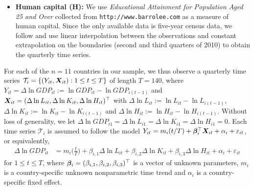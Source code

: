 \documentclass[a4paper,12pt]{article}
\makeatletter
\renewcommand{\eqref}[1]{\tagform@{\ref{#1}}}
\makeatother
\begin{document}
\begin{itemize}[leftmargin=0.5cm]
\item \textbf{Human capital ($\boldsymbol{H}$):} We use \textit{Educational Attainment for Population Aged 25 and Over} collected from \texttt{http://www.barrolee.com} as a measure of human capital. Since the only available data is five-year census data, we follow \cite{Zhang2012} and use linear interpolation between the observations and constant extrapolation on the boundaries (second and third quarters of 2010) to obtain the quarterly time series.
\end{itemize}


For each of the $n=11$ countries in our sample, we thus observe a quarterly time series $\mathcal{T}_i = \{(Y_{it}, \boldsymbol{X}_{it}): 1 \le t \le T \}$ of length $T = 140$, where $Y_{it} = \Delta \ln GDP_{it} := \ln GDP_{it} - \ln GDP_{i(t-1)}$ and $\boldsymbol{X}_{it} = (\Delta \ln L_{it}, \Delta \ln K_{it}, \Delta \ln H_{it})^\top$ with $\Delta \ln L_{it} := \ln L_{it} - \ln L_{i(t-1)}$, $\Delta \ln K_{it} := \ln K_{it} - \ln K_{i(t-1)}$ and $\Delta \ln H_{it} := \ln H_{it} - \ln H_{i(t-1)}$. Without loss of generality, we let $\Delta \ln GDP_{i1} = \Delta \ln L_{i1} = \Delta \ln K_{i1} = \Delta \ln H_{i1} = 0$. Each time series $\mathcal{T}_i$ is assumed to follow the model $Y_{it} = m_i(t/T) + \bm{\beta}^\top_i \boldsymbol{X}_{it} + \alpha_i + \varepsilon_{it}$, or equivalently,  
\begin{align}
 \Delta \ln GDP_{it}
 & = m_i \Big( \frac{t}{T} \Big) + \beta_{i, 1} \Delta \ln L_{it} + \beta_{i, 2} \Delta \ln K_{it} + \beta_{i, 3} \Delta \ln H_{it} + \alpha_i + \varepsilon_{it} \label{eq:model:app}
\end{align}
for $1 \le t \le T$, where $\bm{\beta}_i = (\beta_{i, 1}, \beta_{i, 2}, \beta_{i, 3})^\top$ is a vector of unknown parameters, $m_i$ is a country-specific unknown nonparametric time trend and $\alpha_i$ is a country-specific fixed effect. 
\end{document}
